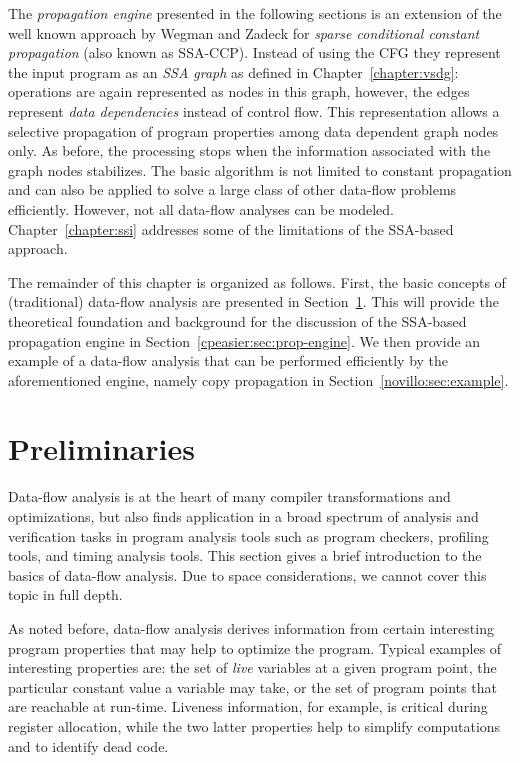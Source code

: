 The \emph{propagation engine} presented in the following sections is an extension of the well known approach by Wegman and Zadeck for \emph{sparse conditional constant propagation} (also known as SSA-CCP). 
Instead of using the CFG they represent the input program as an
\emph{SSA graph} as defined in Chapter~\ref{chapter:vsdg}: operations are again
represented as nodes in this graph, however, the edges represent \emph{data dependencies} instead of control flow. 
This representation allows a selective propagation of program properties among data dependent graph nodes only. 
As before, the processing stops when the information associated with the graph nodes stabilizes. 
The basic algorithm is not limited to constant propagation and can also be applied to solve a large class of other data-flow problems efficiently. 
However, not all data-flow analyses can be modeled.
Chapter~\ref{chapter:ssi} addresses some of the limitations of the SSA-based approach.

The remainder of this chapter is organized as follows. 
First, the basic concepts of (traditional) data-flow analysis are presented in Section~\ref{novillo:sec:preliminaries}. 
This will provide the theoretical foundation and background for the discussion of the SSA-based propagation engine in Section~\ref{cpeasier:sec:prop-engine}. 
We then provide an example of a data-flow analysis that can be performed efficiently by the aforementioned engine, namely copy propagation in Section~\ref{novillo:sec:example}.

\section{Preliminaries}
\label{novillo:sec:preliminaries}

Data-flow analysis is at the heart of many compiler transformations and optimizations, but also finds application in a broad spectrum of analysis and verification tasks in program analysis tools such as program checkers, profiling tools, and timing analysis tools. 
This section gives a brief introduction to the basics of data-flow analysis. 
Due to space considerations, we cannot cover this topic in full depth.

As noted before, data-flow analysis derives information from certain interesting program properties that may help to optimize the program. 
Typical examples of interesting properties are: 
the set of \emph{live} variables at a given program point, the particular constant value a variable may take, or the set of program points that are reachable at run-time. 
Liveness information, for example, is critical during register allocation, while the two latter properties help to simplify computations and to identify dead code.

